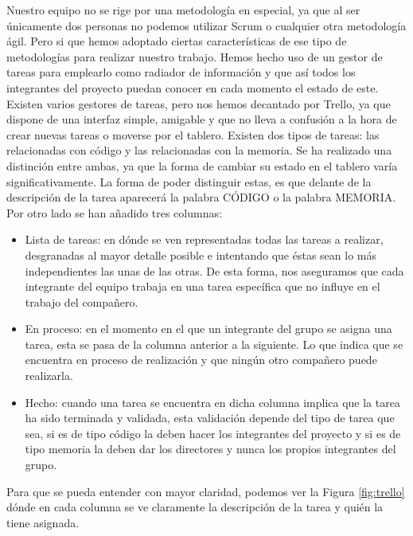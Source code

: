 Nuestro equipo no se rige por una metodología en especial, ya que al ser únicamente dos personas no podemos utilizar Scrum o cualquier otra metodología ágil. Pero si que hemos adoptado ciertas características de ese tipo de metodologías para realizar nuestro trabajo.
Hemos hecho uso de un gestor de tareas para emplearlo como radiador de información y que así todos los integrantes del proyecto puedan conocer en cada momento el estado de este. Existen varios gestores de tareas, pero nos hemos decantado por Trello, ya que dispone de una interfaz simple, amigable y que no lleva a confusión a la hora de crear nuevas tareas o moverse por el tablero.
Existen dos tipos de tareas: las relacionadas con código y las relacionadas con la memoria. Se ha realizado una distinción entre ambas, ya que la forma de cambiar su estado en el tablero varía significativamente. La forma de poder distinguir estas, es que delante de la descripción de la tarea aparecerá la palabra CÓDIGO o la palabra MEMORIA. Por otro lado se han añadido tres columnas:
\begin{itemize}
	\item Lista de tareas: en dónde se ven representadas todas las tareas a realizar, desgranadas al mayor detalle posible e intentando que éstas sean lo más independientes las unas de las otras. De esta forma, nos aseguramos que cada integrante del equipo trabaja en una tarea específica que no influye en el trabajo del compañero.
	\item En proceso: en el momento en el que un integrante del grupo se asigna una tarea, esta se pasa de la columna anterior a la siguiente. Lo que indica que se encuentra en proceso de realización y que ningún otro compañero puede realizarla. 
	\item Hecho: cuando una tarea se encuentra en dicha columna implica que la tarea  ha sido terminada y validada, esta validación depende del tipo de tarea que sea, si es de tipo código la deben hacer los integrantes del proyecto y si es de tipo memoria la deben dar los directores y nunca los propios integrantes del grupo.
	
\end{itemize}

Para que se pueda entender con mayor claridad, podemos ver la Figura \ref{fig:trello} dónde en cada columna se ve claramente la descripción de la tarea y quién la tiene asignada.

